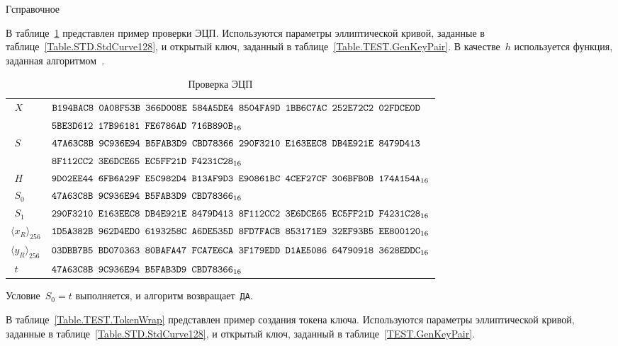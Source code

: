 \begin{appendix}{Г}{справочное}
\label{TEST.Verify}

В таблице~\ref{Table.TEST.Verify} представлен пример проверки ЭЦП.
%
Используются параметры эллиптической кривой, 
заданные в таблице~\ref{Table.STD.StdCurve128},
и открытый ключ, заданный в таблице~\ref{Table.TEST.GenKeyPair}. 
%
В качестве~$h$ используется функция,
заданная алгоритмом~.

\begin{table}[!h]
\caption{Проверка ЭЦП}\label{Table.TEST.Verify}
{\small
\begin{tabular}{|l|l|}
\hline
$\phantom{\langle}X$ & 
$\texttt{B194BAC8~0A08F53B~366D008E~584A5DE4~8504FA9D~1BB6C7AC~252E72C2~02FDCE0D}$\\
&
$\texttt{5BE3D612~17B96181~FE6786AD~716B890B}_{16}$\\
%
\hline
$\phantom{\langle}S$ & 
$\texttt{47A63C8B~9C936E94~B5FAB3D9~CBD78366~290F3210~E163EEC8~DB4E921E~8479D413}$\\
&
$\texttt{8F112CC2~3E6DCE65~EC5FF21D~F4231C28}_{16}$\\
\dhline
%
$\phantom{\langle}H$ & 
$\texttt{9D02EE44~6FB6A29F~E5C982D4~B13AF9D3~E90861BC~4CEF27CF~306BFB0B~174A154A}_{16}$\\
%
\hline
$\phantom{\langle}S_0$ & 
$\texttt{47A63C8B~9C936E94~B5FAB3D9~CBD78366}_{16}$\\
%
\hline
$\phantom{\langle}S_1$ & 
$\texttt{290F3210~E163EEC8~DB4E921E~8479D413~8F112CC2~3E6DCE65~EC5FF21D~F4231C28}_{16}$\\
%
\hline
$\langle x_R\rangle_{256}$ & 
$\texttt{1D5A382B~962D4ED0~6193258C~A6DE535D~8FD7FACB~853171E9~32EF93B5~EE800120}_{16}$\\
%
\hline
$\langle y_R\rangle_{256}$ & 
$\texttt{03DBB7B5~BD070363~80BAFA47~FCA7E6CA~3F179EDD~D1AE5086~64790918~3628EDDC}_{16}$\\
\hline
$\phantom{\langle}t$ & 
$\texttt{47A63C8B~9C936E94~B5FAB3D9~CBD78366}_{16}$\\
\hline
\end{tabular}
}
\end{table}

Условие~$S_0=t$ выполняется, 
и алгоритм возвращает~\texttt{ДА}.

\label{TEST.TokenWrap}

В таблице~\ref{Table.TEST.TokenWrap} представлен пример создания токена ключа.
%
Используются параметры эллиптической кривой, 
заданные в таблице~\ref{Table.STD.StdCurve128},
и открытый ключ, заданный в таблице~\ref{TEST.GenKeyPair}.


\end{appendix}
